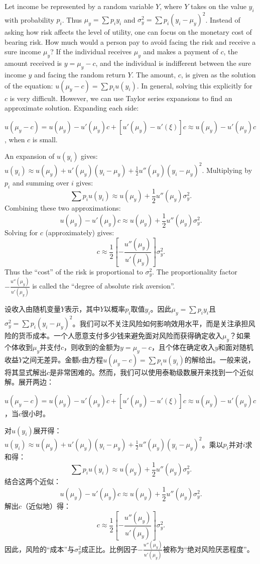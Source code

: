 \begin{original}
Let income be represented by a random variable $Y$, where $Y$ takes on the value $y_i$ with probability $p_i$. Thus $\mu_y = \sum p_i y_i$ and $\sigma_y^2 = \sum p_i(y_i - \mu_y)^2$. Instead of asking how risk affects the level of utility, one can focus on the monetary cost of bearing risk. How much would a person pay to avoid facing the risk and receive a sure income $\mu_y$? If the individual receives $\mu_y$ and makes a payment of $c$, the amount received is $y = \mu_y - c$, and the individual is indifferent between the sure income $y$ and facing the random return $Y$. The amount, $c$, is given as the solution of the equation: $u(\mu_y - c) = \sum p_i u(y_i)$. In general, solving this explicitly for $c$ is very difficult. However, we can use Taylor series expansions to find an approximate solution. Expanding each side:

$u(\mu_y - c) = u(\mu_y) - u'(\mu_y)c + [u'(\mu_y) - u'(\xi)]c \approx u(\mu_y) - u'(\mu_y)c$, when $c$ is small.

An expansion of $u(y_i)$ gives: $u(y_i) \approx u(\mu_y) + u'(\mu_y)(y_i - \mu_y) + \frac{1}{2}u''(\mu_y)(y_i - \mu_y)^2$. Multiplying by $p_i$ and summing over $i$ gives:
\[
\sum p_i u(y_i) \approx u(\mu_y) + \frac{1}{2}u''(\mu_y)\sigma_y^2.
\]
Combining these two approximations:
\[
u(\mu_y) - u'(\mu_y)c \approx u(\mu_y) + \frac{1}{2}u''(\mu_y)\sigma_y^2.
\]
Solving for $c$ (approximately) gives:
\[
c \approx \frac{1}{2}\left[-\frac{u''(\mu_y)}{u'(\mu_y)}\right]\sigma_y^2.
\]
Thus the ``cost'' of the risk is proportional to $\sigma_y^2$. The proportionality factor $-\frac{u''(\mu_y)}{u'(\mu_y)}$ is called the ``degree of absolute risk aversion''.
\end{original}
\begin{translation}
设收入由随机变量$Y$表示，其中$Y$以概率$p_i$取值$y_i$。因此$\mu_y = \sum p_i y_i$且$\sigma_y^2 = \sum p_i(y_i - \mu_y)^2$。我们可以不关注风险如何影响效用水平，而是关注承担风险的货币成本。一个人愿意支付多少钱来避免面对风险而获得确定收入$\mu_y$？如果个体收到$\mu_y$并支付$c$，则收到的金额为$y = \mu_y - c$，且个体在确定收入$y$和面对随机收益$Y$之间无差异。金额$c$由方程$u(\mu_y - c) = \sum p_i u(y_i)$的解给出。一般来说，将其显式解出$c$是非常困难的。然而，我们可以使用泰勒级数展开来找到一个近似解。展开两边：

$u(\mu_y - c) = u(\mu_y) - u'(\mu_y)c + [u'(\mu_y) - u'(\xi)]c \approx u(\mu_y) - u'(\mu_y)c$，当$c$很小时。

对$u(y_i)$展开得：$u(y_i) \approx u(\mu_y) + u'(\mu_y)(y_i - \mu_y) + \frac{1}{2}u''(\mu_y)(y_i - \mu_y)^2$。乘以$p_i$并对$i$求和得：
\[
\sum p_i u(y_i) \approx u(\mu_y) + \frac{1}{2}u''(\mu_y)\sigma_y^2.
\]
结合这两个近似：
\[
u(\mu_y) - u'(\mu_y)c \approx u(\mu_y) + \frac{1}{2}u''(\mu_y)\sigma_y^2.
\]
解出$c$（近似地）得：
\[
c \approx \frac{1}{2}\left[-\frac{u''(\mu_y)}{u'(\mu_y)}\right]\sigma_y^2.
\]
因此，风险的``成本''与$\sigma_y^2$成正比。比例因子$-\frac{u''(\mu_y)}{u'(\mu_y)}$被称为``绝对风险厌恶程度''。
\end{translation}

